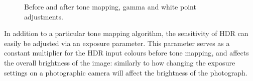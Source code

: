 \documentclass[11pt, oneside]{report}
\begin{document}
\begin{figure}[!htbp]
  \centering
  \hfill
  \caption{Before and after \gls{tone mapping}, gamma and white point adjustments.}
\end{figure}

In addition to a particular \gls{tone mapping} algorithm, the sensitivity of \gls{HDR} can easily be adjusted via an exposure parameter. This parameter serves as a constant multiplier for the \gls{HDR} input colours before \gls{tone mapping}, and affects the overall brightness of the image: similarly to how changing the exposure settings on a photographic camera will affect the brightness of the photograph.
\end{document}
